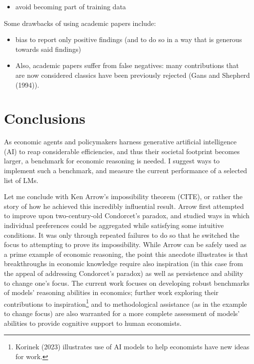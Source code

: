 \documentclass[
]{article}
\providecommand{\tightlist}{%
  \setlength{\itemsep}{0pt}\setlength{\parskip}{0pt}}\usepackage{longtable,booktabs,array}
\begin{document}
\begin{itemize}
\tightlist
\item
  avoid becoming part of training data
\end{itemize}

Some drawbacks of using academic papers include:

\begin{itemize}
\tightlist
\item
  bias to report only positive findings (and to do so in a way that is
  generous towards said findings)
\item
  Also, academic papers suffer from false negatives: many contributions
  that are now considered classics have been previously rejected (Gans
  and Shepherd (1994)).
\end{itemize}

\hypertarget{conclusions}{%
\section{Conclusions}\label{conclusions}}

As economic agents and policymakers harness generative artificial
intelligence (AI) to reap considerable efficiencies, and thus their
societal footprint becomes larger, a benchmark for economic reasoning is
needed. I suggest ways to implement such a benchmark, and measure the
current performance of a selected list of LMs.

Let me conclude with Ken Arrow's impossibility theorem (CITE), or rather
the story of how he achieved this incredibly influential result. Arrow
first attempted to improve upon two-century-old Condorcet's paradox, and
studied ways in which individual preferences could be aggregated while
satisfying some intuitive conditions. It was only through repeated
failures to do so that he switched the focus to attempting to prove its
impossibility. While Arrow can be safely used as a prime example of
economic reasoning, the point this anecdote illustrates is that
breakthroughs in economic knowledge require also inspiration (in this
case from the appeal of addressing Condorcet's paradox) as well as
persistence and ability to change one's focus. The current work focuses
on developing robust benchmarks of models' reasoning abilities in
economics; further work exploring their contributions to
inspiration\footnote{Korinek (2023) illustrates use of AI models to help
  economists have new ideas for work.} and to methodological assistance
(as in the example to change focus) are also warranted for a more
complete assessment of models' abilities to provide cognitive support to
human economists.
\end{document}
